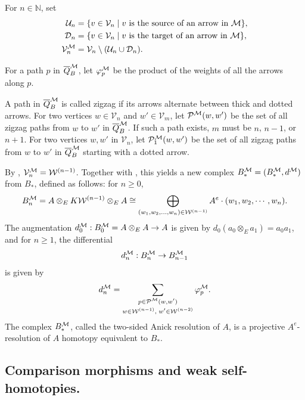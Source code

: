 \documentclass[10pt, reqno]{amsart}
\theoremstyle{definition}
\theoremstyle{remark}
\numberwithin{equation}{section}
\begin{document}
 For \( n \in \mathbb{N} \), set
\[ \begin{aligned}
    \mathcal{U}_n &= \{ v \in \mathcal{V}_n \mid v \text{ is the source of an arrow in } \mathcal{M} \},\\
    \mathcal{D}_n &= \{ v \in \mathcal{V}_n \mid v \text{ is the target of an arrow in } \mathcal{M} \},\\
    \mathcal{V}_n^{\mathcal{M}} &= \mathcal{V}_n \setminus ( \mathcal{U}_n \cup \mathcal{D}_n ).
\end{aligned}\]

For a path \( p \) in \(\overline{Q}_B^{\mathcal{M}}\), let \( \varphi_p^{\mathcal{M}} \) be the product of the weights of all the arrows along \( p \).

A path in \(\overline{Q}_B^{\mathcal{M}}\) is called zigzag if its arrows alternate between thick and dotted arrows. 
For two vertices \( w \in \mathcal{V}_n \) and \( w' \in \mathcal{V}_m \), let \( \mathcal{P}^{\mathcal{M}}(w, w') \) be the set of all zigzag paths from \( w \) to \( w' \) in \(\overline{Q}_B^{\mathcal{M}}\). If such a path exists, \(m\) must be $n$, $n-1$, or $n+1$. For two vertices \(w, w'\) in \(\mathcal{V}_n\), let \(\mathcal{P}_1^{\mathcal{M}}(w, w')\) be the set of all zigzag paths from \(w\) to \(w'\) in \(\overline{Q}_B^{\mathcal{M}}\) starting with a dotted arrow.

By \cite[Theorem 4.3 ]{CLZ24}, \(\mathcal{V}_n^{\mathcal{M}} =\mathcal{W}^{(n-1)}\). Together with \cite[Theorem 3.3]{CLZ24}, this yields a new complex \(B_*^{\mathcal{M}}=(B^{\mathcal{M}}_*, d^{\mathcal{M}})\) from \(B_*\), defined as follows: for \(n\ge 0\),
\[B_n^{\mathcal{M}} = A \otimes_E K\mathcal{W}^{(n-1)} \otimes_E A\cong \bigoplus_{(w_1,w_2,\dots,w_n)\in \mathcal{W}^{(n-1)}} A^e \cdot (w_1,w_2,\cdots,w_n).\] 
The augmentation $d_0^{\mathcal{M}} : B_0^{\mathcal{M}}= A \otimes_E A \to A$ is given by \( d_0(a_0\otimes_E a_1)=a_0a_1\), and for \(n\ge 1\), the differential
$$d_n^{\mathcal{M}} : B_n^{\mathcal{M}} \to B_{n-1}^{\mathcal{M}}$$
is given by
\begin{equation}
 d_n^{\mathcal{M}}=\sum_{\substack{p \in \mathcal{P}^{\mathcal{M}}(w,w') \\[2pt] w \in \mathcal{W}^{(n-1)},\; w' \in \mathcal{W}^{(n-2)}}} \varphi_p^{\mathcal{M}}.
\end{equation}
The complex \(B_*^{\mathcal{M}}\), called the two-sided Anick resolution of \(A\), is a projective \(A^e\)-resolution of \(A\) homotopy equivalent to \(B_*\).


\subsection{Comparison morphisms and weak self-homotopies.}\mbox{}
\end{document}

